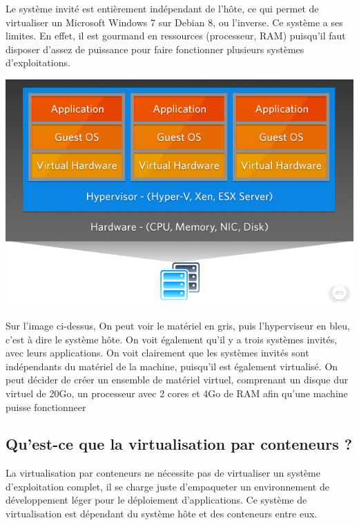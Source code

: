 \documentclass[12pt,a4paper]{article}
\begin{document}
Le système invité est entièrement indépendant de l'hôte, ce qui permet de virtualiser un Microsoft Windows 7 sur Debian 8, ou l'inverse. Ce système a ses limites. En effet, il est gourmand en ressources (processeur, RAM) puisqu'il faut disposer d'assez de puissance pour faire fonctionner plusieurs systèmes d'exploitations.

\begin{center}
  \includegraphics[width=15cm]{images_rapport/virtualisation.jpg}
\end{center}

Sur l'image ci-dessus, On peut voir le matériel en gris, puis l'hyperviseur en bleu, c'est à dire le système hôte. On voit également qu'il y a trois systèmes invités, avec leurs applications. On voit clairement que les systèmes invités sont indépendants du matériel de la machine, puisqu'il est également virtualisé. On peut décider de créer un ensemble de matériel virtuel, comprenant un disque dur virtuel de 20Go, un processeur avec 2 cores et 4Go de RAM afin qu'une machine puisse fonctionneer

\subsection{Qu'est-ce que la virtualisation par conteneurs ?}

La virtualisation par conteneurs ne nécessite pas de virtualiser un système d'exploitation complet, il se charge juste d'empaqueter un environnement de développement léger pour le déploiement d'applications. Ce système de virtualisation est dépendant du système hôte et des conteneurs entre eux. 
\end{document}
